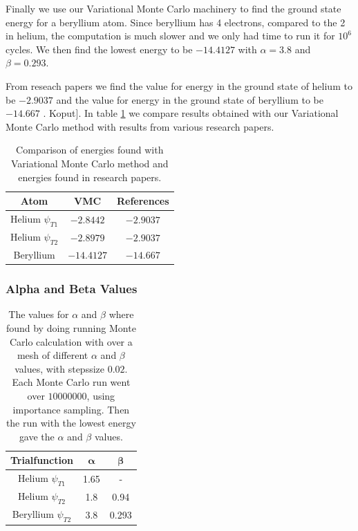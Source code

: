 \documentclass[11pt]{article}
\begin{document}
	Finally we use our Variational Monte Carlo machinery to find the ground
	state energy for a beryllium atom. Since beryllium has 4 electrons,
	compared to the 2 in helium, the computation is much slower and we
	only had time to run it for $10^{6}$ cycles. We then find the lowest
	energy to be $-14.4127$ with $\alpha=3.8$ and $\beta=0.293$.

	From reseach papers we find the value for energy in the ground state
	of helium to be $-2.9037$ \cite{Kinoshita:1957:PR} and the value
	for energy in the ground state of beryllium to be $-14.667$ \cite{Koput:2011:PCCP}.
	Koput{]}. In table \ref{tab:energyReference} we compare results
	obtained with our Variational Monte Carlo method with results from
	various research papers.

	\begin{table}
		\centering
		\begin{tabular}{|c|c|c|}
			\hline
			Atom & VMC & References\tabularnewline
			\hline
			\hline
			Helium $\psi_{T1}$ & $-2.8442$ & $-2.9037$ \tabularnewline
			\hline
			Helium $\psi_{T2}$ & $-2.8979$ & $-2.9037$ \tabularnewline
			\hline
			Beryllium & $-14.4127$ & $-14.667$\tabularnewline
			\hline
		\end{tabular}

		\protect
		\caption{Comparison of energies found with Variational Monte Carlo method and
		energies found in research papers.}
		\label{tab:energyReference}
	\end{table}

	\subsubsection{Alpha and Beta Values}

		\begin{table}
			\center
			\begin{tabular}{| c | c| c |}
			    \hline
			   	\textbf{Trialfunction} & \(\mathbf{\alpha}\) & \(\mathbf{\beta}\)
			    \\ \hline
			    Helium $\psi_{T1}$ & 1.65 & -
			    \\ \hline
			    Helium $\psi_{T2}$ & 1.8 & 0.94
			    \\	\hline
			    Beryllium $\psi_{T2}$	& 3.8	&	 0.293
			    \\ \hline
	  		\end{tabular}
	  		\caption{The values for \(\alpha\) and \( \beta \) where found by doing running Monte Carlo calculation with over a mesh of different \(\alpha\) and \( \beta \) values, with stepssize \(0.02\). Each Monte Carlo run went over \(10 000 	000\), using importance sampling. Then the run with the lowest energy gave the \(\alpha\) and \(\beta\) values.}
		  	\label{tab:alpha_beta}
		\end{table}
\end{document}
